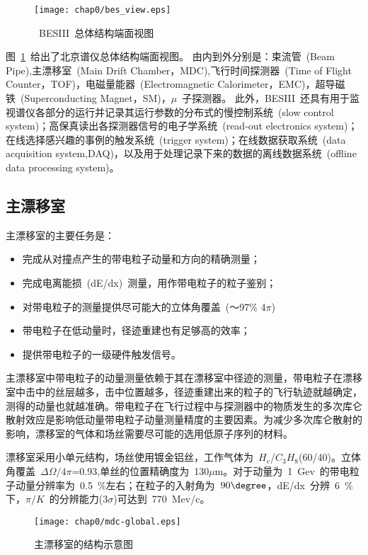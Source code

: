 \begin{figure}[!h]
  \centering
  \texttt{[image: chap0/bes\_view.eps]}
  \caption{~BESIII~总体结构端面视图}
  \label{fig:BESIII}
\end{figure}
图~\ref{fig:BESIII}~给出了北京谱仪总体结构端面视图。
由内到外分别是：束流管~(Beam Pipe),主漂移室~(Main Drift Chamber，MDC),飞行时间探测器~(Time of Flight Counter，TOF)，电磁量能器~(Electromagnetic Calorimeter，EMC)，超导磁铁~(Superconducting Magnet，SM)，$\mu$~子探测器。
此外，BESIII~还具有用于监视谱仪各部分的运行并记录其运行参数的分布式的慢控制系统~(slow control system)；高保真读出各探测器信号的电子学系统~(read-out electronics system)；在线选择感兴趣的事例的触发系统~(trigger system)；在线数据获取系统~(data acquisition system,DAQ)，以及用于处理记录下来的数据的离线数据系统~(offline data processing system)。
\subsection{主漂移室}
主漂移室的主要任务是：

\begin{itemize}
\item{完成从对撞点产生的带电粒子动量和方向的精确测量；}
\item{完成电离能损~(dE/dx)~测量，用作带电粒子的粒子鉴别；}
\item{对带电粒子的测量提供尽可能大的立体角覆盖~(～97$\%$ 4$\pi$)~}
\item{带电粒子在低动量时，径迹重建也有足够高的效率；}
\item{提供带电粒子的一级硬件触发信号。}
\end{itemize}


主漂移室中带电粒子的动量测量依赖于其在漂移室中径迹的测量，带电粒子在漂移室中击中的丝层越多，击中位置越多，径迹重建出来的粒子的飞行轨迹就越确定，测得的动量也就越准确。带电粒子在飞行过程中与探测器中的物质发生的多次库仑散射效应是影响低动量带电粒子动量测量精度的主要因素。为减少多次库仑散射的影响，漂移室的气体和场丝需要尽可能的选用低原子序列的材料。

漂移室采用小单元结构，场丝使用镀金铝丝，工作气体为~$H_{e}$/$C_{3}H_{8}$(60/40)。立体角覆盖~$\Delta\Omega/4\pi$=0.93,单丝的位置精确度为~130$\mu$m。对于动量为~1~Gev~的带电粒子动量分辨率为~0.5~$\%$左右；在粒子的入射角为~$90\degree$，dE/dx~分辨~6~$\%$下，$\pi/K$~的分辨能力(3$\sigma$)可达到~770~Mev/c。
\begin{figure}[!h]
  \centering
  \texttt{[image: chap0/mdc-global.eps]}
  \caption{主漂移室的结构示意图}
  \label{fig:mdc-global}
\end{figure}

